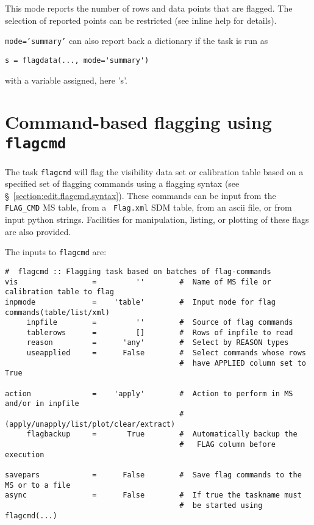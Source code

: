 This mode reports the number of rows and data points that are
flagged. The selection of reported points can be restricted (see
inline help for details).

{\tt mode='summary'} can also report back a dictionary if the task is run as 

\small
\begin{verbatim}
s = flagdata(..., mode='summary')
\end{verbatim}
\normalsize

with a variable assigned, here 's'.



\section{Command-based flagging using {\tt flagcmd}}
\label{section:edit.flagcmd}

The task {\tt flagcmd} will flag the visibility data set or
calibration table based on a specified set of flagging commands using
a flagging syntax (see \S~\ref{section:edit.flagcmd.syntax}).  These
commands can be input from the {\tt FLAG\_CMD} MS table, from a {\tt
  Flag.xml} SDM table, from an ascii file, or from input python
strings.  Facilities for manipulation, listing, or plotting of these
flags are also provided.

The inputs to {\tt flagcmd} are:
\small
\begin{verbatim}
#  flagcmd :: Flagging task based on batches of flag-commands
vis                 =         ''        #  Name of MS file or calibration table to flag
inpmode             =    'table'        #  Input mode for flag commands(table/list/xml)
     inpfile        =         ''        #  Source of flag commands
     tablerows      =         []        #  Rows of inpfile to read
     reason         =      'any'        #  Select by REASON types
     useapplied     =      False        #  Select commands whose rows
                                        #  have APPLIED column set to True

action              =    'apply'        #  Action to perform in MS and/or in inpfile
                                        #   (apply/unapply/list/plot/clear/extract)
     flagbackup     =       True        #  Automatically backup the
                                        #   FLAG column before execution

savepars            =      False        #  Save flag commands to the MS or to a file
async               =      False        #  If true the taskname must
                                        #  be started using flagcmd(...)

\end{verbatim}
\normalsize

